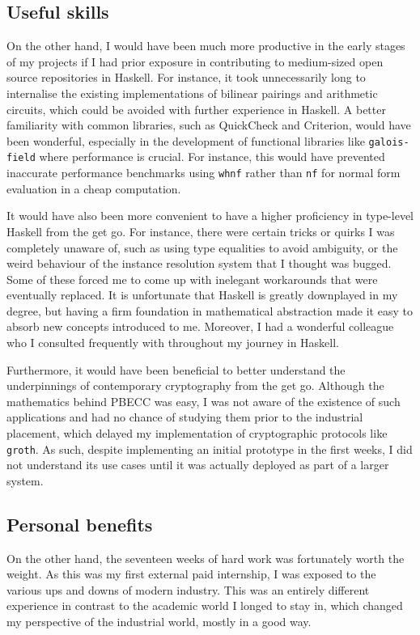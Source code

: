 \documentclass[11pt]{article}
\begin{document}
\subsection{Useful skills}

On the other hand, I would have been much more productive in the early stages of my projects if I had prior exposure in contributing to medium-sized open source repositories in Haskell. For instance, it took unnecessarily long to internalise the existing implementations of bilinear pairings and arithmetic circuits, which could be avoided with further experience in Haskell. A better familiarity with common libraries, such as QuickCheck and Criterion, would have been wonderful, especially in the development of functional libraries like \texttt{galois-field} where performance is crucial. For instance, this would have prevented inaccurate performance benchmarks using \texttt{whnf} rather than \texttt{nf} for normal form evaluation in a cheap computation.

It would have also been more convenient to have a higher proficiency in type-level Haskell from the get go. For instance, there were certain tricks or quirks I was completely unaware of, such as using type equalities to avoid ambiguity, or the weird behaviour of the instance resolution system that I thought was bugged. Some of these forced me to come up with inelegant workarounds that were eventually replaced. It is unfortunate that Haskell is greatly downplayed in my degree, but having a firm foundation in mathematical abstraction made it easy to absorb new concepts introduced to me. Moreover, I had a wonderful colleague who I consulted frequently with throughout my journey in Haskell.

Furthermore, it would have been beneficial to better understand the underpinnings of contemporary cryptography from the get go. Although the mathematics behind PBECC was easy, I was not aware of the existence of such applications and had no chance of studying them prior to the industrial placement, which delayed my implementation of cryptographic protocols like \texttt{groth}. As such, despite implementing an initial prototype in the first weeks, I did not understand its use cases until it was actually deployed as part of a larger system.

\subsection{Personal benefits}

On the other hand, the seventeen weeks of hard work was fortunately worth the weight. As this was my first external paid internship, I was exposed to the various ups and downs of modern industry. This was an entirely different experience in contrast to the academic world I longed to stay in, which changed my perspective of the industrial world, mostly in a good way.
\end{document}
